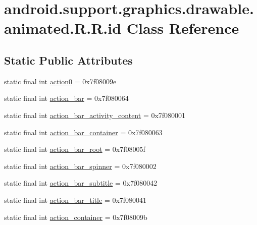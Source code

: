 \hypertarget{classandroid_1_1support_1_1graphics_1_1drawable_1_1animated_1_1_r_1_1id}{
\section{android.support.graphics.drawable.animated.R.R.id Class Reference}
\label{classandroid_1_1support_1_1graphics_1_1drawable_1_1animated_1_1_r_1_1id}
}
\subsection*{Static Public Attributes}
\begin{CompactItemize}
\item 
static final int \hyperlink{classandroid_1_1support_1_1graphics_1_1drawable_1_1animated_1_1_r_1_1id_3656608a216ec8aa2c2b183483fbe692}{action0} = 0x7f08009e
\item 
static final int \hyperlink{classandroid_1_1support_1_1graphics_1_1drawable_1_1animated_1_1_r_1_1id_d0dd0e22629467f78151d711c164e969}{action\_\-bar} = 0x7f080064
\item 
static final int \hyperlink{classandroid_1_1support_1_1graphics_1_1drawable_1_1animated_1_1_r_1_1id_d4d7633b4349c967aea323cb529f9bfa}{action\_\-bar\_\-activity\_\-content} = 0x7f080001
\item 
static final int \hyperlink{classandroid_1_1support_1_1graphics_1_1drawable_1_1animated_1_1_r_1_1id_982f9aca71e8ecb7d7deb2815c26ecf5}{action\_\-bar\_\-container} = 0x7f080063
\item 
static final int \hyperlink{classandroid_1_1support_1_1graphics_1_1drawable_1_1animated_1_1_r_1_1id_992cc34c3eb0a2ef092658ac44b9bf22}{action\_\-bar\_\-root} = 0x7f08005f
\item 
static final int \hyperlink{classandroid_1_1support_1_1graphics_1_1drawable_1_1animated_1_1_r_1_1id_efe8fbbd4d2bb13f39253f2a33c4a046}{action\_\-bar\_\-spinner} = 0x7f080002
\item 
static final int \hyperlink{classandroid_1_1support_1_1graphics_1_1drawable_1_1animated_1_1_r_1_1id_bf401531b10b77197ad63bab29fd6c68}{action\_\-bar\_\-subtitle} = 0x7f080042
\item 
static final int \hyperlink{classandroid_1_1support_1_1graphics_1_1drawable_1_1animated_1_1_r_1_1id_f0a204937a338b321735b84bb17804db}{action\_\-bar\_\-title} = 0x7f080041
\item 
static final int \hyperlink{classandroid_1_1support_1_1graphics_1_1drawable_1_1animated_1_1_r_1_1id_37858188032e0a6a980ef1b4ed305b19}{action\_\-container} = 0x7f08009b

\end{CompactItemize}
